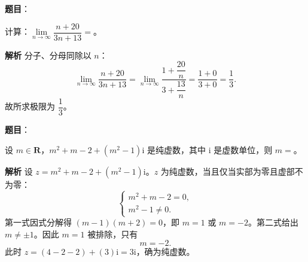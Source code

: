 

\begin{answer}

\textbf{题目}：

计算：$\lim\limits_{n\to\infty}\dfrac{n+20}{3n+13}=$\gkblank{}。

\textbf{解析}
分子、分母同除以 $n$：
\nopagebreak[4]
\[\lim_{n\to\infty}\frac{n+20}{3n+13}
=\lim_{n\to\infty}\frac{1+\dfrac{20}{n}}{3+\dfrac{13}{n}}
=\frac{1+0}{3+0}=\frac13.\]
故所求极限为 $\dfrac13$。


\end{answer}
\begin{answer}

\textbf{题目}：

设 $m\in\mathbf R$，$m^2+m-2+(m^2-1)\mathrm i$ 是纯虚数，其中 $\mathrm i$ 是虚数单位，则 $m=$\gkblank{}。

\textbf{解析}
设 $z=m^2+m-2+(m^2-1)\mathrm i$。$z$ 为纯虚数，当且仅当实部为零且虚部不为零：
\nopagebreak[4]
\[\begin{cases}
m^2+m-2=0,\\
m^2-1\neq0.
\end{cases}\]
第一式因式分解得 $(m-1)(m+2)=0$，即 $m=1$ 或 $m=-2$。第二式给出 $m\neq\pm1$。因此 $m=1$ 被排除，只有
\nopagebreak[4]
\[m=-2.\]
此时 $z=(4-2-2)+(3)\mathrm i=3\mathrm i$，确为纯虚数。


\end{answer}
